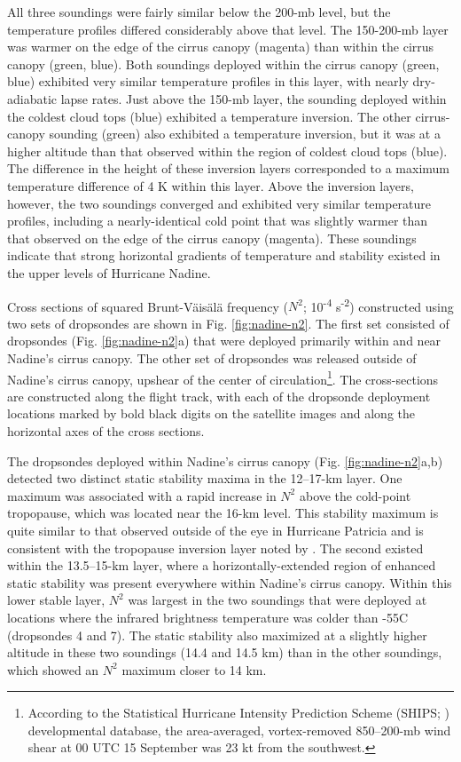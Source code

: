 All three soundings were fairly similar below the 200-mb level, but the temperature profiles differed considerably above that level.
The 150-200-mb layer was warmer on the edge of the cirrus canopy (magenta) than within the cirrus canopy (green, blue).
Both soundings deployed within the cirrus canopy (green, blue) exhibited very similar temperature profiles in this layer, with nearly dry-adiabatic lapse rates.
Just above the 150-mb layer, the sounding deployed within the coldest cloud tops (blue) exhibited a temperature inversion.
The other cirrus-canopy sounding (green) also exhibited a temperature inversion, but it was at a higher altitude than that observed within the region of coldest cloud tops (blue).
The difference in the height of these inversion layers corresponded to a maximum temperature difference of 4 K within this layer.
Above the inversion layers, however, the two soundings converged and exhibited very similar temperature profiles, including a nearly-identical cold point that was slightly warmer than that observed on the edge of the cirrus canopy (magenta).
These soundings indicate that strong horizontal gradients of temperature and stability existed in the upper levels of Hurricane Nadine.

Cross sections of squared Brunt-V{\"a}is{\"a}l{\"a} frequency ($N^2$; 10\textsuperscript{-4} s\textsuperscript{-2}) constructed using two sets of dropsondes are shown in Fig. \ref{fig:nadine-n2}.
The first set consisted of dropsondes (Fig. \ref{fig:nadine-n2}a) that were deployed primarily within and near Nadine's cirrus canopy.
The other set of dropsondes was released outside of Nadine's cirrus canopy, upshear of the center of circulation\footnote{According to the Statistical Hurricane Intensity Prediction Scheme (SHIPS; \citeauthor{DeMariaetal2005} \citeyear{DeMariaetal2005}) developmental database, the area-averaged, vortex-removed 850--200-mb wind shear at 00 UTC 15 September was 23 kt from the southwest.}.
The cross-sections are constructed along the flight track, with each of the dropsonde deployment locations marked by bold black digits on the satellite images and along the horizontal axes of the cross sections.

The dropsondes deployed within Nadine's cirrus canopy (Fig. \ref{fig:nadine-n2}a,b) detected two distinct static stability maxima in the 12--17-km layer.
One maximum was associated with a rapid increase in $N^2$ above the cold-point tropopause, which was located near the 16-km level.
This stability maximum is quite similar to that observed outside of the eye in Hurricane Patricia \citep{DuranMolinari2018} and is consistent with the tropopause inversion layer noted by \cite{Wirth2003}.
The second existed within the 13.5--15-km layer, where a horizontally-extended region of enhanced static stability was present everywhere within Nadine's cirrus canopy.
Within this lower stable layer, $N^2$ was largest in the two soundings that were deployed at locations where the infrared brightness temperature was colder than -55\textdegree{}C (dropsondes 4 and 7).
The static stability also maximized at a slightly higher altitude in these two soundings (14.4 and 14.5 km) than in the other soundings, which showed an $N^2$ maximum closer to 14 km.

